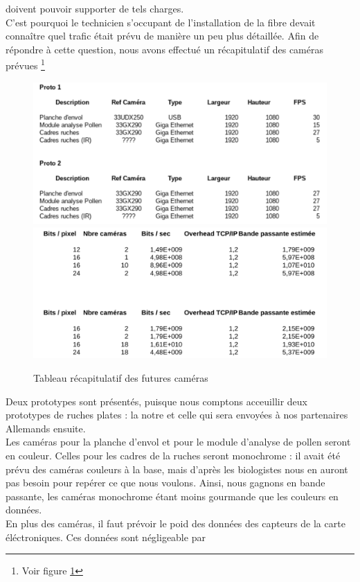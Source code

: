 \documentclass[11pt,french,a4paper]{report}
\begin{document}
doivent pouvoir supporter de tels charges. \\
C'est pourquoi le technicien s'occupant de l'installation de la fibre devait connaître quel trafic était prévu de manière un
peu plus détaillée. Afin de répondre à cette question, nous avons effectué un récapitulatif des caméras prévues 
\footnote{Voir figure \ref{tab_recap_cam}}
\begin{figure}[!h]
    \centering
    \includegraphics[scale=0.25]{../images/annexes/camera_bp.png} 
    \includegraphics[scale=0.25]{../images/annexes/camera_bp2.png} 
    \caption{Tableau récapitulatif des futures caméras}
    \label{tab_recap_cam}
\end{figure}
Deux prototypes sont présentés, puisque nous comptons acceuillir deux prototypes de ruches plates : la notre et 
celle qui sera envoyées à nos partenaires Allemands ensuite. \\
Les caméras pour la planche d'envol et pour le module d'analyse de pollen seront en couleur. Celles pour les cadres de la ruches
seront monochrome : il avait été prévu des caméras couleurs à la base, mais d'après les biologistes nous en auront pas besoin pour 
repérer ce que nous voulons. Ainsi, nous gagnons en bande passante, les caméras monochrome étant moins gourmande que les couleurs 
en données. \\
En plus des caméras, il faut prévoir le poid des données des capteurs de la carte éléctroniques. Ces données sont négligeable par
\end{document}
